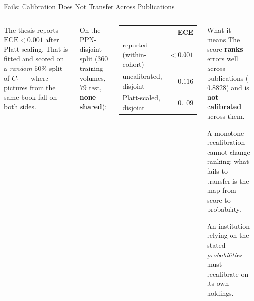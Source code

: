 \documentclass[aspectratio=169,11pt]{beamer}
\begin{document}
\begin{frame}{Fails: Calibration Does Not Transfer Across Publications}
\begin{columns}[T]
\small
The thesis reports $\text{ECE} < 0.001$ after Platt scaling. That is fitted and scored on a \emph{random} $50\%$ split of $C_1$ --- where pictures from the same book fall on both sides.
\vspace{2mm}

On the PPN-disjoint split ($360$ training volumes, $79$ test, \textbf{none shared}):
\vspace{1mm}
\begin{center}
\footnotesize
\begin{tabular}{@{}l r@{}}
\toprule
& \textbf{ECE} \\
\midrule
reported (within-cohort) & $< 0.001$ \\
uncalibrated, disjoint & $0.116$ \\
Platt-scaled, disjoint & $\mathbf{0.109}$ \\
\bottomrule
\end{tabular}
\end{center}

\begin{alertblock}{\small What it means}
\footnotesize The score \textbf{ranks} errors well across publications ($0.8828$) and is \textbf{not calibrated} across them.
\vspace{1mm}

A monotone recalibration cannot change ranking; what fails to transfer is the map from score to probability.
\vspace{1mm}

An institution relying on the stated \emph{probabilities} must recalibrate on its own holdings.
\end{alertblock}
\end{columns}
\end{frame}
\end{document}
